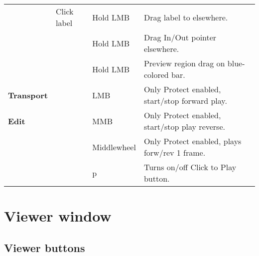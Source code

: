 \begin{longtable}[h]{>{\bfseries}p{}p{}p{}p{}}
  & Click label & Hold LMB & Drag label to elsewhere. \\
  &  & Hold LMB & Drag In/Out pointer elsewhere. \\
  &  & Hold LMB & Preview region drag on blue-colored bar. \\
  \midrule
  \textcolor{CinBlueText}{Transport} &  & LMB & Only Protect enabled, start/stop forward play. \\
  \midrule
  \textcolor{CinBlueText}{Edit} &  & MMB & Only Protect enabled, start/stop play reverse. \\
  &  & Middlewheel & Only Protect enabled, plays forw/rev 1 frame. \\
  &  & p & Turns on/off Click to Play button. \\
  \bottomrule
\end{longtable}


\section{Viewer window }%
\label{sec:viewer_window_shortcuts}

\subsection*{Viewer buttons }%
\label{ssec:viewer_buttons}

